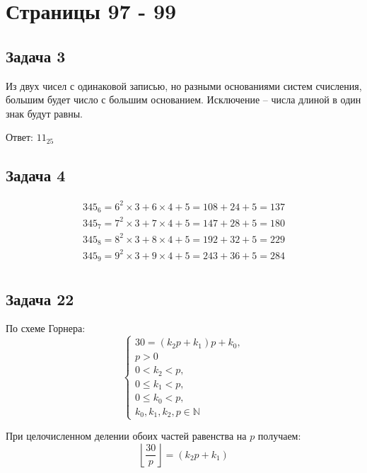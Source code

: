 \section{Страницы 97 - 99}
\subsection{Задача 3}
Из двух чисел с одинаковой записью, но разными основаниями систем счисления,
большим будет число с большим основанием. Исключение -- числа длиной в один 
знак будут равны.

Ответ: $ 11_{25} $

\subsection{Задача 4}
\begin{equation*}
  \begin{gathered}
    345_{6} = 6^2 \times 3 + 6 \times 4 + 5 = 108 + 24 + 5 = 137 \\
    345_{7} = 7^2 \times 3 + 7 \times 4 + 5 = 147 + 28 + 5 = 180 \\
    345_{8} = 8^2 \times 3 + 8 \times 4 + 5 = 192 + 32 + 5 = 229 \\
    345_{9} = 9^2 \times 3 + 9 \times 4 + 5 = 243 + 36 + 5 = 284 \\
  \end{gathered}
\end{equation*}

\subsection{Задача 22}
По схеме Горнера:
\begin{equation*}
  \begin{cases}
    30 = (k_2p + k_1) p + k_0, \\
    p > 0 \\
    0 < k_2 < p, \\
    0 \le k_1 < p, \\
    0 \le k_0 < p, \\
    k_0, k_1, k_2, p \in \mathbb N 
  \end{cases}
\end{equation*}

При целочисленном делении обоих частей равенства на $ p $ получаем:
\begin{equation}
  \label{eq:22div}
  \left\lfloor \frac{30}{p} \right\rfloor = (k_2p + k_1)
\end{equation}

